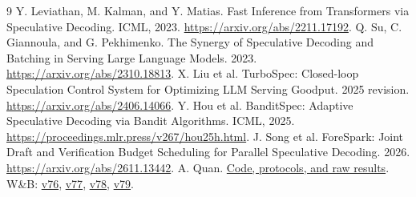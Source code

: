 \documentclass[10pt]{article}
\begin{document}
\begin{thebibliography}{9}\footnotesize
{} Y. Leviathan, M. Kalman, and Y. Matias. Fast Inference from Transformers via Speculative Decoding. ICML, 2023. \url{https://arxiv.org/abs/2211.17192}.
 Q. Su, C. Giannoula, and G. Pekhimenko. The Synergy of Speculative Decoding and Batching in Serving Large Language Models. 2023. \url{https://arxiv.org/abs/2310.18813}.
 X. Liu et al. TurboSpec: Closed-loop Speculation Control System for Optimizing LLM Serving Goodput. 2025 revision. \url{https://arxiv.org/abs/2406.14066}.
 Y. Hou et al. BanditSpec: Adaptive Speculative Decoding via Bandit Algorithms. ICML, 2025. \url{https://proceedings.mlr.press/v267/hou25h.html}.
 J. Song et al. ForeSpark: Joint Draft and Verification Budget Scheduling for Parallel Speculative Decoding. 2026. \url{https://arxiv.org/abs/2611.13442}.
 A. Quan. \href{https://github.com/angelinaquan/batched-speculative-decoding}{Code, protocols, and raw results}. W\&B: \href{https://wandb.ai/aquan-world-model/18657-speculative-pilot/runs/0arn12x7}{v76}, \href{https://wandb.ai/aquan-world-model/18657-speculative-pilot/runs/saxiid98}{v77}, \href{https://wandb.ai/aquan-world-model/18657-speculative-pilot/runs/62e5e0u7}{v78}, \href{https://wandb.ai/aquan-world-model/18657-speculative-pilot/runs/tvk5jo6x}{v79}.
\end{thebibliography}
\end{document}

